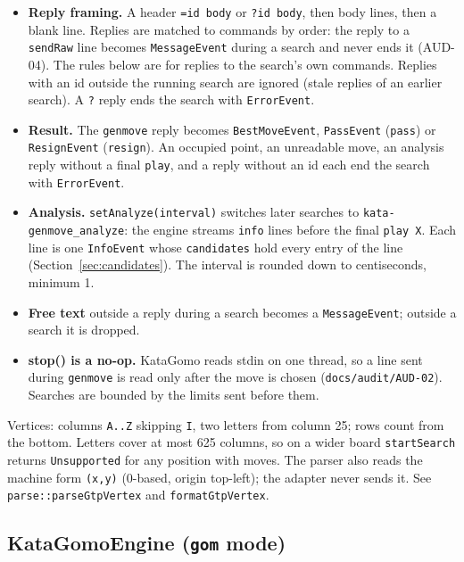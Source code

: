 \documentclass[11pt,a4paper]{article}
\newcommand{\code}[1]{\texttt{#1}}
\newcommand{\file}[1]{\texttt{#1}}
\begin{document}
\begin{itemize}
  \item \textbf{Reply framing.} A header \code{=id body} or \code{?id body}, then body lines, then a
        blank line. Replies are matched to commands by order: the reply to a \code{sendRaw} line
        becomes \code{MessageEvent} during a search and never ends it (AUD-04). The rules below
        are for replies to the search's own commands. Replies with an id outside the running
        search are ignored (stale replies of an earlier search). A \code{?} reply ends the search
        with \code{ErrorEvent}.
  \item \textbf{Result.} The \code{genmove} reply becomes \code{BestMoveEvent}, \code{PassEvent}
        (\code{pass}) or \code{ResignEvent} (\code{resign}). An occupied point, an unreadable
        move, an analysis reply without a final \code{play}, and a reply without an id each end
        the search with \code{ErrorEvent}.
  \item \textbf{Analysis.} \code{setAnalyze(interval)} switches later searches to
        \code{kata-genmove\_analyze}: the engine streams \code{info} lines before the final
        \code{play X}. Each line is one \code{InfoEvent} whose \code{candidates} hold every entry
        of the line (Section~\ref{sec:candidates}). The interval is rounded down to
        centiseconds, minimum 1.
  \item \textbf{Free text} outside a reply during a search becomes a \code{MessageEvent}; outside a
        search it is dropped.
  \item \textbf{stop() is a no-op.} KataGomo reads stdin on one thread, so a line sent during
        \code{genmove} is read only after the move is chosen (\file{docs/audit/AUD-02}). Searches
        are bounded by the limits sent before them.
\end{itemize}

\noindent Vertices: columns \code{A..Z} skipping \code{I}, two letters from column 25; rows count
from the bottom. Letters cover at most 625 columns, so on a wider board \code{startSearch} returns
\code{Unsupported} for any position with moves. The parser also reads the machine form
\code{(x,y)} (0-based, origin top-left); the adapter never sends it. See
\code{parse::parseGtpVertex} and \code{formatGtpVertex}.

\subsection{KataGomoEngine (\code{gom} mode)}
\end{document}
